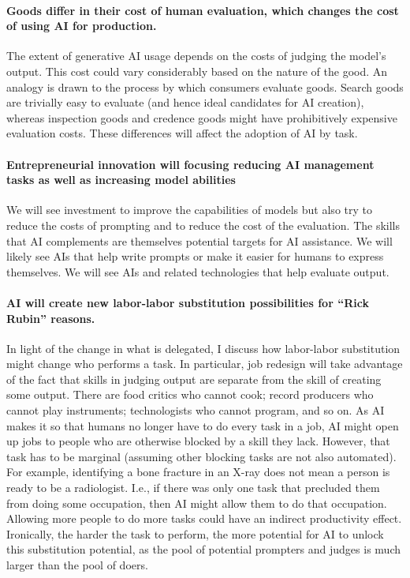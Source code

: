 \documentclass{article}
\begin{document}
\paragraph{Goods differ in their cost of human evaluation, which changes the cost of using AI for production.}
The extent of generative AI usage depends on the costs of judging the model's output.
This cost could vary considerably based on the nature of the good.
An analogy is drawn to the process by which consumers evaluate goods. 
Search goods are trivially easy to evaluate (and hence ideal candidates for AI creation), whereas inspection goods and credence goods might have prohibitively expensive evaluation costs. 
These differences will affect the adoption of AI by task.

\paragraph{Entrepreneurial innovation will focusing reducing AI management tasks as well as increasing model abilities}
We will see investment to improve the capabilities of models but also try to reduce the costs of prompting and to reduce the cost of the evaluation. 
The skills that AI complements are themselves potential targets for AI assistance. 
We will likely see AIs that help write prompts or make it easier for humans to express themselves.  
We will see AIs and related technologies that help evaluate output. 

\paragraph{AI will create new labor-labor substitution possibilities for ``Rick Rubin'' reasons.}
In light of the change in what is delegated, I discuss how labor-labor substitution might change who performs a task. 
In particular, job redesign will take advantage of the fact that skills in judging output are separate from the skill of creating some output.
There are food critics who cannot cook; record producers who cannot play instruments; technologists who cannot program, and so on.
As AI makes it so that humans no longer have to do every task in a job, AI might open up jobs to people who are otherwise blocked by a skill they lack.
However, that task has to be marginal (assuming other blocking tasks are not also automated). 
For example, identifying a bone fracture in an X-ray does not mean a person is ready to be a radiologist.
I.e., if there was only one task that precluded them from doing some occupation, then AI might allow them to do that occupation.
Allowing more people to do more tasks could have an indirect productivity effect. 
Ironically, the harder the task to perform, the more potential for AI to unlock this substitution potential, as the pool of potential prompters and judges is much larger than the pool of doers.
\end{document}
